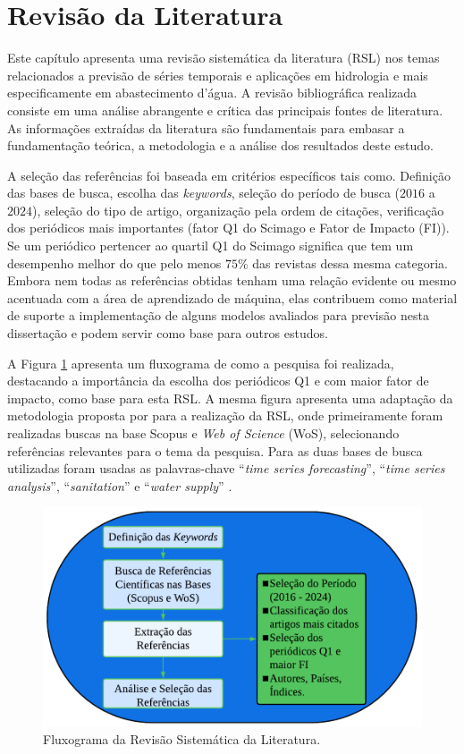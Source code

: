 \section{Revis\~ao da Literatura}\label{sec:refteo}

Este capítulo apresenta uma revisão sistemática  da literatura (RSL) nos temas relacionados a previsão de séries temporais e aplicações em hidrologia e mais especificamente em abastecimento d'água. A revisão bibliográfica realizada consiste em uma análise abrangente e crítica das principais fontes de literatura. As informações extraídas da literatura são fundamentais para embasar a fundamentação teórica, a metodologia e a análise dos resultados deste estudo.


A seleção das referências foi baseada em critérios específicos tais como. Definição das bases de busca, escolha das \textit{keywords}, seleção do período de busca ($2016$ a $2024$), seleção do tipo de artigo, organização pela ordem de citações, verificação dos periódicos mais importantes (fator Q1 do Scimago e Fator de Impacto (FI)). Se um periódico pertencer ao quartil Q1 do Scimago significa que tem um desempenho melhor do que pelo menos $75$\% das revistas dessa mesma categoria. Embora nem todas as referências obtidas tenham uma relação evidente ou mesmo acentuada com a área de aprendizado de máquina, elas contribuem como material de suporte a implementação de alguns modelos avaliados para previsão nesta dissertação e podem servir como base para outros estudos.

A Figura \ref{fig:serie-temporal} apresenta um fluxograma de como a pesquisa foi realizada, destacando a importância da escolha dos periódicos Q1 e com maior fator de impacto, como base para esta RSL. A mesma figura apresenta uma adaptação da metodologia proposta por  para a realização da RSL, onde primeiramente foram realizadas buscas na base Scopus e \textit{Web of Science} (WoS), selecionando referências relevantes para o tema da pesquisa. Para as duas bases de busca utilizadas foram usadas as palavras-chave ``\textit{time series forecasting}'', ``\textit{time series analysis}'', ``\textit{sanitation}'' e ``\textit{water supply}'' .

\begin{figure}[!htb]
	\centering
	\caption{Fluxograma da Revisão Sistemática da Literatura.}
	\label{fig:serie-temporal}
	\includegraphics[width=0.7\linewidth]{Revisao/Figuras/Figura2.pdf}
\end{figure}

